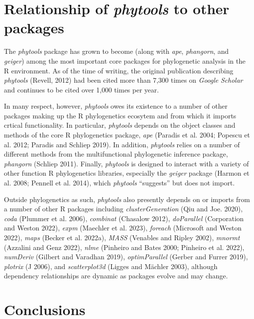\documentclass[fleqn,10pt,lineno]{wlpeerj} %
\begin{document}
\hypertarget{relationship-of-phytools-to-other-packages}{%
\section{\texorpdfstring{Relationship of \emph{phytools} to other packages}{Relationship of phytools to other packages}}\label{relationship-of-phytools-to-other-packages}}

The \emph{phytools} package has grown to become (along with \emph{ape}, \emph{phangorn}, and \emph{geiger}) among the most important core packages for phylogenetic analysis in the R environment. As of the time of writing, the original publication describing \emph{phytools} (Revell, 2012) had been cited more than 7,300 times on \emph{Google Scholar} and continues to be cited over 1,000 times per year.

In many respect, however, \emph{phytools} owes its existence to a number of other packages making up the R phylogenetics ecosytem and from which it imports crtical functionality. In particular, \emph{phytools} depends on the object classes and methods of the core R phylogenetics package, \emph{ape} (Paradis et al. 2004; Popescu et al. 2012; Paradis and Schliep 2019). In addition, \emph{phytools} relies on a number of different methods from the multifunctional phylogenetic inference package, \emph{phangorn} (Schliep 2011). Finally, \emph{phytools} is designed to interact with a variety of other function R phylogenetics libraries, especially the \emph{geiger} package (Harmon et al. 2008; Pennell et al. 2014), which \emph{phytools} ``suggests'' but does not import.

Outside phylogenetics as such, \emph{phytools} also presently depends on or imports from a number of other R packages including \emph{clusterGeneration} (Qiu and Joe. 2020), \emph{coda} (Plummer et al. 2006), \emph{combinat} (Chasalow 2012), \emph{doParallel} (Corporation and Weston 2022), \emph{expm} (Maechler et al. 2023), \emph{foreach} (Microsoft and Weston 2022), \emph{maps} (Becker et al. 2022a), \emph{MASS} (Venables and Ripley 2002), \emph{mnormt} (Azzalini and Genz 2022), \emph{nlme} (Pinheiro and Bates 2000; Pinheiro et al. 2022), \emph{numDeriv} (Gilbert and Varadhan 2019), \emph{optimParallel} (Gerber and Furrer 2019), \emph{plotrix} (J 2006), and \emph{scatterplot3d} (Ligges and Mächler 2003), although dependency relationships are dynamic as packages evolve and may change.

\hypertarget{conclusions}{%
\section{Conclusions}\label{conclusions}}
\end{document}
